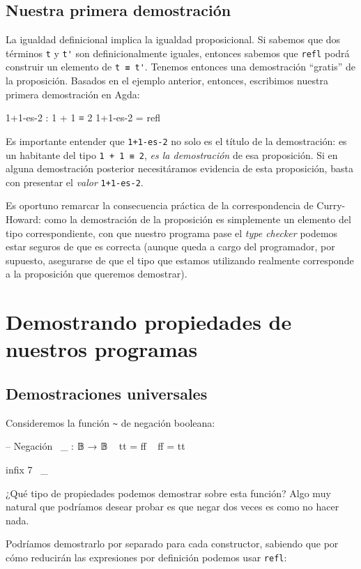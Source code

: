 \documentclass[11pt]{article} %
\begin{document}
\subsection{Nuestra primera demostración}
La igualdad definicional implica la igualdad proposicional. Si sabemos que dos términos  \verb|t| y \verb|t'| son definicionalmente iguales, entonces sabemos que \verb|refl| podrá construir un elemento de \verb|t ≡ t'|. Tenemos entonces una demostración ``gratis'' de la proposición. Basados en el ejemplo anterior, entonces, escribimos nuestra primera demostración en Agda:

\begin{code}
1+1-es-2 : 1 + 1 ≡ 2
1+1-es-2 = refl
\end{code}

Es importante entender que \verb|1+1-es-2| no solo es el título de la demostración: es un habitante del tipo \verb|1 + 1 ≡ 2|, \textit{es la demostración} de esa proposición. Si en alguna demostración posterior necesitáramos evidencia de esta proposición, basta con presentar el \textit{valor} \verb|1+1-es-2|. 

Es oportuno remarcar la consecuencia práctica de la correspondencia de Curry-Howard: como la demostración de la proposición es simplemente un elemento del tipo correspondiente, con que nuestro programa pase el \textit{type checker} podemos estar seguros de que es correcta (aunque queda a cargo del programador, por supuesto, asegurarse de que el tipo que estamos utilizando realmente corresponde a la proposición que queremos demostrar).


\section{Demostrando propiedades de nuestros programas}
\subsection{Demostraciones universales}
Consideremos la función \verb|~| de negación booleana:

\begin{code}
-- Negación
~_ : 𝔹 → 𝔹
~ tt = ff
~ ff = tt

infix 7 ~_
\end{code}

¿Qué tipo de propiedades podemos demostrar sobre esta función? Algo muy natural que podríamos desear probar es que negar dos veces es como no hacer nada.

Podríamos demostrarlo por separado para cada constructor, sabiendo que por cómo reducirán las expresiones por definición podemos usar \verb|refl|:
\end{document}
